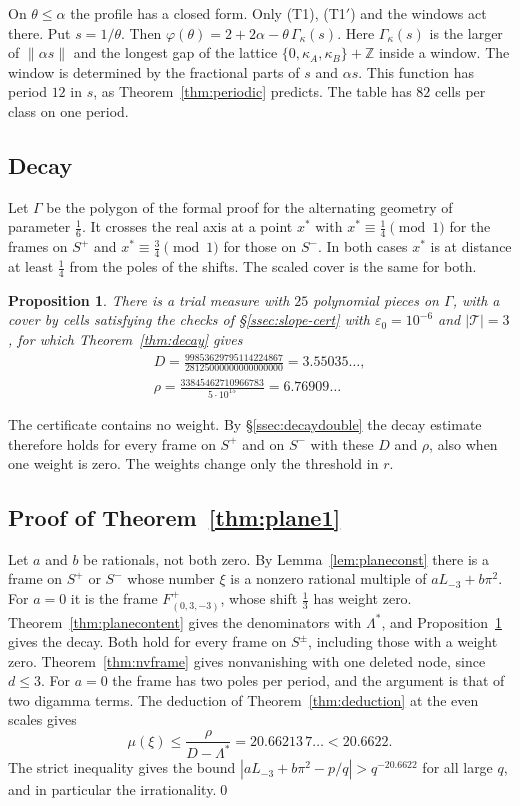 \documentclass[11pt]{amsart}
\newtheorem{proposition}[theorem]{Proposition}
\theoremstyle{definition}
\theoremstyle{remark}
\numberwithin{equation}{section}
\newcommand{\Z}{\mathbb Z}
\newcommand{\Lt}{L_{-3}}             %
\newcommand{\MuPlaneA}{20.6622}
\begin{document}
On $\theta\le\alpha$ the profile has a closed form. Only (T1), (T1$'$) and the windows act there. Put $s=1/\theta$. Then
$\varphi(\theta)=2+2\alpha-\theta\,\Gamma_\kappa(s)$. Here $\Gamma_\kappa(s)$ is the larger of $\|\alpha s\|$ and the
longest gap of the lattice $\{0,\kappa_A,\kappa_B\}+\Z$ inside a window. The window is determined by the fractional
parts of $s$ and $\alpha s$. This function has period $12$ in $s$, as Theorem~\ref{thm:periodic} predicts. The table
has $82$ cells per class on one period.

\subsection{Decay}
Let $\Gamma$ be the polygon of the formal proof for the alternating geometry of parameter $\frac16$. It crosses the real
axis at a point $x^*$ with $x^*\equiv\frac14\pmod1$ for the frames on $S^+$ and $x^*\equiv\frac34\pmod1$ for those on
$S^-$. In both cases $x^*$ is at distance at least $\frac14$ from the poles of the shifts. The scaled cover is the same
for both.

\begin{proposition}\label{prop:planecert}
There is a trial measure with $25$ polynomial pieces on $\Gamma$, with a cover by cells satisfying the checks of
\S\ref{ssec:slope-cert} with $\varepsilon_0=10^{-6}$ and $|\mathcal T|=3$, for which Theorem~\ref{thm:decay} gives
\begin{gather*}
 D=\frac{99853629795114224867}{28125000000000000000}=3.55035\ldots,\\
 \rho=\frac{33845462710966783}{5\cdot10^{15}}=6.76909\ldots
\end{gather*}
\end{proposition}

The certificate contains no weight. By \S\ref{ssec:decaydouble} the decay estimate therefore holds for every frame on
$S^+$ and on $S^-$ with these $D$ and $\rho$, also when one weight is zero. The weights change only the threshold in $r$.

\subsection{Proof of Theorem~\ref{thm:plane1}}
Let $a$ and $b$ be rationals, not both zero. By Lemma~\ref{lem:planeconst} there is a frame on $S^+$ or $S^-$ whose
number $\xi$ is a nonzero rational multiple of $a\Lt+b\pi^2$. For $a=0$ it is the frame $F^+_{(0,3,-3)}$, whose shift
$\frac13$ has weight zero. Theorem~\ref{thm:planecontent} gives the denominators with $\Lambda^*$, and
Proposition~\ref{prop:planecert} gives the decay. Both hold for every frame on $S^\pm$, including those with a weight
zero. Theorem~\ref{thm:nvframe} gives nonvanishing with one deleted node, since $d\le3$. For $a=0$ the frame has two
poles per period, and the argument is that of two digamma terms. The deduction of Theorem~\ref{thm:deduction} at the
even scales gives
\[
 \mu(\xi)\le\frac\rho{D-\Lambda^*}=20.66213\,7\ldots<\MuPlaneA .
\]
The strict inequality gives the bound $|a\Lt+b\pi^2-p/q|>q^{-\MuPlaneA}$ for all large $q$, and in particular the
irrationality.\qed
\end{document}
